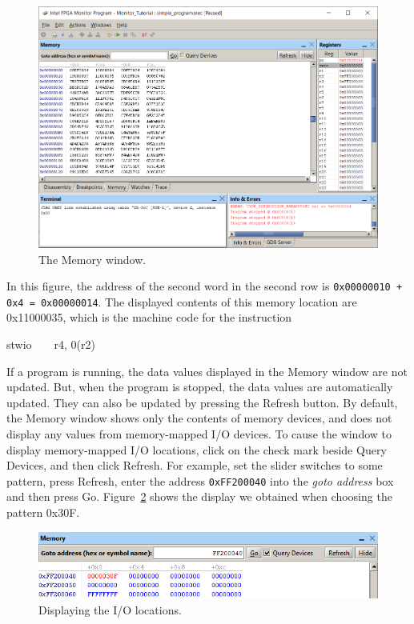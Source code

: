 \documentclass[11pt, twoside, pdftex]{article}
\begin{document}
\begin{figure}[H]
   \begin{center}
      \includegraphics[scale=0.57]{screenshots/figure20.png}
   \end{center}
   \caption{The Memory window.} 
	 \label{fig:20}
\end{figure}

In this figure, the address of the second word in the
second row is \texttt{0x00000010 + 0x4 = 0x00000014}.
The displayed contents of this memory location are 0x11000035,
which is the machine code for the instruction
\begin{center}
stwio~~~~r4, 0(r2)
\end{center}

If a program is running, the data values displayed in the
Memory window are not updated. But, when the program is stopped,
the data values are automatically updated. They can also be
updated by pressing the {\sf Refresh} button. 
By default, the Memory window shows only the contents of memory
devices, and does not display any values from memory-mapped I/O devices. To cause the window to display memory-mapped
I/O locations, click on the check mark beside 
{\sf Query Devices}, and then click 
{\sf Refresh}. For example, set the slider switches to some
pattern, press {\sf Refresh}, enter the address 
\texttt{0xFF200040} into the {\it goto address} box and then press {\sf Go}. Figure~\ref{fig:21} shows the
display we obtained when choosing the pattern 0x30F.

\begin{figure}[H]
   \begin{center}
      \includegraphics[scale=1]{screenshots/figure21.png}
   \end{center}
   \caption{Displaying the I/O locations.} 
	 \label{fig:21}
\end{figure}
\end{document}
